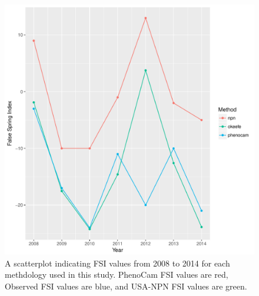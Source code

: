 \documentclass{article}\usepackage[]{graphicx}\usepackage[]{color}
\makeatletter
\def\maxwidth{ %
  \ifdim\Gin@nat@width>\linewidth
    \linewidth
  \else
    \Gin@nat@width
  \fi
}
\makeatother
\begin{document}
\begin{figure}[H]
\includegraphics[width=\maxwidth]{figure/fsifig-1} \caption[A scatterplot indicating FSI values from 2008 to 2014 for each methdology used in this study]{A scatterplot indicating FSI values from 2008 to 2014 for each methdology used in this study. PhenoCam FSI values are red, Observed FSI values are blue, and USA-NPN FSI values are green.}\label{fig:fsifig}
\end{figure}
\end{document}
